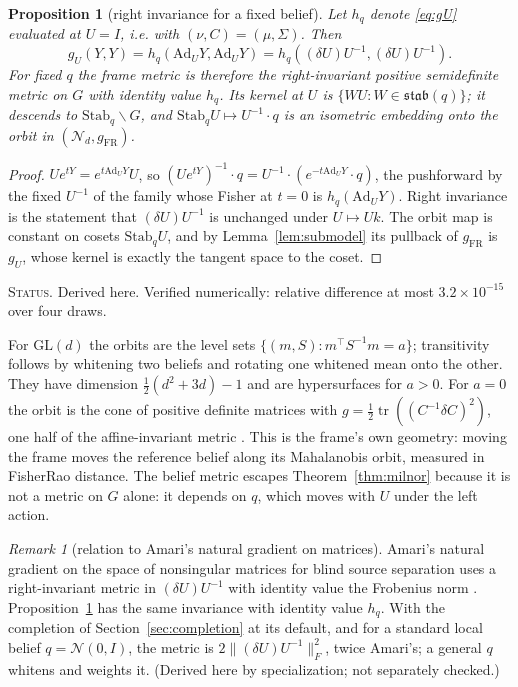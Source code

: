 \documentclass[11pt]{article}
\newtheorem{proposition}[theorem]{Proposition}
\theoremstyle{definition}
\theoremstyle{remark}
\newtheorem{remark}[theorem]{Remark}
\newcommand{\GL}{\mathrm{GL}}
\newcommand{\Ad}{\mathrm{Ad}}
\newcommand{\tr}{\operatorname{tr}}
\newcommand{\stab}{\mathfrak{stab}}
\newcommand{\Stab}{\mathrm{Stab}}
\newcommand{\Normal}{\mathcal{N}}
\newcommand{\ndash}{\textendash}
\newcommand{\status}[1]{\par\smallskip\noindent\textsc{Status.} #1\par\smallskip}
\begin{document}
\begin{proposition}[right invariance for a fixed belief]\label{prop:rightinv}
Let $h_q$ denote \eqref{eq:gU} evaluated at $U=I$, i.e. with $(\nu,C)=(\mu,\Sigma)$. Then
\begin{equation}\label{eq:rightinv}
g_U(Y,Y)=h_q(\Ad_UY,\Ad_UY)=h_q((\delta U)U^{-1},(\delta U)U^{-1}).
\end{equation}
For fixed $q$ the frame metric is therefore the right-invariant positive semidefinite metric on $G$ with identity value $h_q$. Its kernel at $U$ is $\{WU:W\in\stab(q)\}$; it descends to $\Stab_q\backslash G$, and $\Stab_qU\mapsto U^{-1}\cdot q$ is an isometric embedding onto the orbit in $(\Normal_d,g_{\mathrm{FR}})$.
\end{proposition}
\begin{proof}
$Ue^{tY}=e^{t\Ad_UY}U$, so $(Ue^{tY})^{-1}\cdot q=U^{-1}\cdot(e^{-t\Ad_UY}\cdot q)$, the pushforward by the fixed $U^{-1}$ of the family whose Fisher at $t=0$ is $h_q(\Ad_UY)$. Right invariance is the statement that $(\delta U)U^{-1}$ is unchanged under $U\mapsto Uk$. The orbit map is constant on cosets $\Stab_qU$, and by Lemma~\ref{lem:submodel} its pullback of $g_{\mathrm{FR}}$ is $g_U$, whose kernel is exactly the tangent space to the coset.
\end{proof}
\status{Derived here. Verified numerically: relative difference at most $3.2\times10^{-15}$ over four draws.}

For $\GL(d)$ the orbits are the level sets $\{(m,S):m^\top S^{-1}m=a\}$; transitivity follows by whitening two beliefs and rotating one whitened mean onto the other. They have dimension $\frac12(d^2+3d)-1$ and are hypersurfaces for $a>0$. For $a=0$ the orbit is the cone of positive definite matrices with $g=\frac12\tr((C^{-1}\delta C)^2)$, one half of the affine-invariant metric \cite{Skovgaard1984}. This is the frame's own geometry: moving the frame moves the reference belief along its Mahalanobis orbit, measured in Fisher\ndash Rao distance. The belief metric escapes Theorem~\ref{thm:milnor} because it is not a metric on $G$ alone: it depends on $q$, which moves with $U$ under the left action.

\begin{remark}[relation to Amari's natural gradient on matrices]\label{rem:amari-bss}
Amari's natural gradient on the space of nonsingular matrices for blind source separation uses a right-invariant metric in $(\delta U)U^{-1}$ with identity value the Frobenius norm \cite{Amari1998}. Proposition~\ref{prop:rightinv} has the same invariance with identity value $h_q$. With the completion of Section~\ref{sec:completion} at its default, and for a standard local belief $q=\Normal(0,I)$, the metric is $2\|(\delta U)U^{-1}\|_F^2$, twice Amari's; a general $q$ whitens and weights it. (Derived here by specialization; not separately checked.)
\end{remark}
\end{document}
